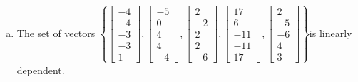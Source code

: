 \begin{exerciseAnswer}
\begin{enumerate}[(a)]
\item  The set of vectors \( \left\{ \left[\begin{array}{c}
-4 \\
-4 \\
-3 \\
-3 \\
1
\end{array}\right] , \left[\begin{array}{c}
-5 \\
0 \\
4 \\
4 \\
-4
\end{array}\right] , \left[\begin{array}{c}
2 \\
-2 \\
2 \\
2 \\
-6
\end{array}\right] , \left[\begin{array}{c}
17 \\
6 \\
-11 \\
-11 \\
17
\end{array}\right] , \left[\begin{array}{c}
2 \\
-5 \\
-6 \\
4 \\
3
\end{array}\right] \right\} \)is linearly dependent.
\end{enumerate}
    
\end{exerciseAnswer}
    
